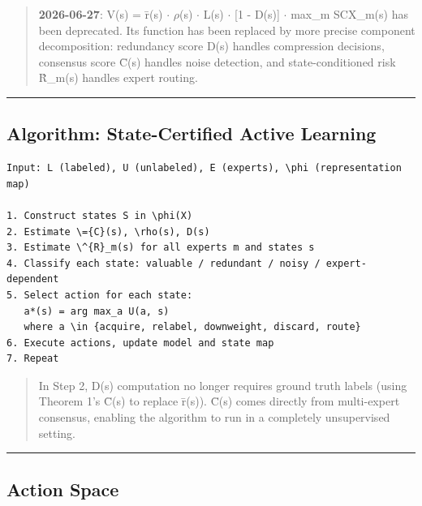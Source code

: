 \documentclass[
  12pt,
]{article}
\begin{document}
\begin{quote}
\textbf{2026-06-27}: V(s) = \={r}(s) $\cdot$ $\rho$(s) $\cdot$ L(s) $\cdot$ [1 - D(s)] $\cdot$ max\_m SCX\_m(s) has been deprecated. Its function has been replaced by more precise component decomposition: redundancy score D(s) handles compression decisions, consensus score \={C}(s) handles noise detection, and state-conditioned risk \^{R}\_m(s) handles expert routing.
\end{quote}

\begin{center}\rule{0.5\linewidth}{0.5pt}\end{center}

\subsection{Algorithm: State-Certified Active Learning}\label{algorithm-state-certified-active-learning}

\begin{verbatim}
Input: L (labeled), U (unlabeled), E (experts), \phi (representation map)

1. Construct states S in \phi(X)
2. Estimate \={C}(s), \rho(s), D(s)
3. Estimate \^{R}_m(s) for all experts m and states s
4. Classify each state: valuable / redundant / noisy / expert-dependent
5. Select action for each state:
   a*(s) = arg max_a U(a, s)
   where a \in {acquire, relabel, downweight, discard, route}
6. Execute actions, update model and state map
7. Repeat
\end{verbatim}

\begin{quote}
In Step 2, D(s) computation no longer requires ground truth labels (using Theorem 1's \={C}(s) to replace \={r}(s)). \={C}(s) comes directly from multi-expert consensus, enabling the algorithm to run in a completely unsupervised setting.
\end{quote}

\begin{center}\rule{0.5\linewidth}{0.5pt}\end{center}

\subsection{Action Space}\label{action-space}
\end{document}
